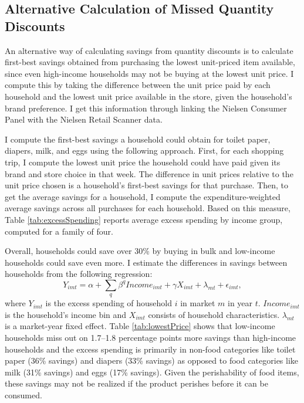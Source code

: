 \documentclass[AER]{AEA_mal}
\begin{document}
\subsection{Alternative Calculation of Missed Quantity Discounts}
\label{excessSpending}
An alternative way of calculating savings from quantity discounts is to calculate first-best savings obtained from purchasing the lowest unit-priced item available, since even high-income households may not be buying at the lowest unit price. I compute this by taking the difference between the unit price paid by each household and the lowest unit price available in the store, given the household's brand preference. I get this information through linking the Nielsen Consumer Panel with the Nielsen Retail Scanner data.

I compute the first-best savings a household could obtain for toilet paper, diapers, milk, and eggs using the following approach. First, for each shopping trip, I compute the lowest unit price the household could have paid given its brand and store choice in that week. The difference in unit prices relative to the unit price chosen is a household's first-best savings for that purchase. Then, to get the average savings for a household, I compute the expenditure-weighted average savings across all purchases for each household. Based on this measure, Table \ref{tab:excessSpending} reports average excess spending by income group, computed for a family of four.



Overall, households could save over 30\% by buying in bulk and low-income households could save even more. I estimate the differences in savings between households from the following regression:
\begin{equation}
\label{eq:excessSpending}
Y_{imt} = \alpha + \sum_q \beta^q Income_{imt} + \gamma X_{imt} + \lambda_{mt} + \epsilon_{imt},
\end{equation}
where $Y_{imt}$ is the excess spending of household $i$ in market $m$ in year $t$. $Income_{imt}$ is the household's income bin and $X_{imt}$ consists of household characteristics. $\lambda_{mt}$ is a market-year fixed effect. Table \ref{tab:lowestPrice} shows that low-income households miss out on 1.7--1.8 percentage points more savings than high-income households and the excess spending is primarily in non-food categories like toilet paper (36\% savings) and diapers (33\% savings) as opposed to food categories like milk (31\% savings) and eggs (17\% savings). Given the perishability of food items, these savings may not be realized if the product perishes before it can be consumed.
\end{document}
